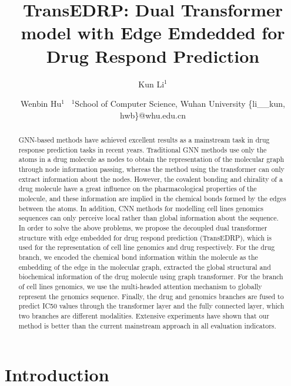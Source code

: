\documentclass{article}
\title{TransEDRP: Dual Transformer model with Edge Emdedded for Drug Respond Prediction}
\author{
Kun Li$^1$
\and
Wenbin Hu$^1$\
\affiliations
$^1$School of Computer Science, Wuhan University
\emails
\{li\_\_kun, hwb\}@whu.edu.cn
}
\begin{document}
\maketitle

\begin{abstract}


GNN-based methods have achieved excellent results as a mainstream task in drug response prediction tasks in recent years. Traditional GNN methods use only the atoms in a drug molecule as nodes to obtain the representation of the molecular graph through node information passing, whereas the method using the transformer can only extract information about the nodes. However, the covalent bonding and chirality of a drug molecule have a great influence on the pharmacological properties of the molecule, and these information are implied in the chemical bonds formed by the edges between the atoms. In addition, CNN methods for modelling cell lines genomics sequences can only perceive local rather than global information about the sequence. In order to solve the above problems, we propose the decoupled dual  transformer structure with edge embedded for drug respond prediction (TransEDRP), which is used for the representation of cell line genomics and drug respectively. For the drug branch, we encoded the chemical bond information within the molecule as the embedding of the edge in the molecular graph, extracted the global structural and biochemical information of the drug molecule using graph transformer. For the branch of cell lines genomics, we use the multi-headed attention mechanism to globally represent the genomics sequence. Finally, the drug and genomics branches are fused to predict IC50 values through the transformer layer and the fully connected layer, which two branches are different modalities. Extensive experiments have shown that our method is better than the current mainstream approach in all evaluation indicators.















\end{abstract}

\section{Introduction}
\end{document}
